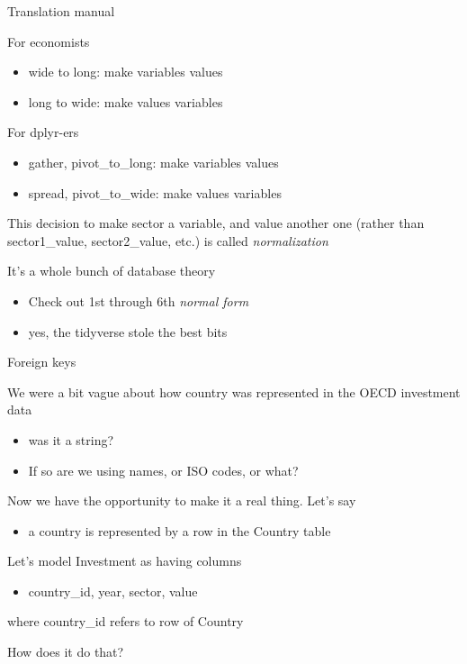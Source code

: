 \documentclass{hertieteaching}
\begin{document}
\begin{frame}{Translation manual}

For economists
\begin{itemize}
  \item wide to long: make variables values
  \item long to wide: make values variables
\end{itemize}

For \textsf{dplyr}-ers
\begin{itemize}
  \item \textsf{gather}, \textsf{pivot\_to\_long}: make variables values
  \item \textsf{spread}, \textsf{pivot\_to\_wide}: make values variables
\end{itemize}

This decision to make sector a 
variable, and value another one (rather than \textsf{sector1\_value}, \textsf{sector2\_value}, etc.) is called 
\textit{normalization}

It's a whole bunch of database theory
\begin{itemize}
  \item Check out 1st through 6th \textit{normal form}
  \item yes, the \textsf{tidyverse} stole the best bits 
\end{itemize}
	
\end{frame}

\begin{frame}{Foreign keys}

We were a bit vague about how country was represented in the OECD investment data
\begin{itemize}
  \item was it a string? 
  \item If so are we using names, or ISO codes, or what?
\end{itemize}
Now we have the opportunity to make it a real thing. Let's say
\begin{itemize}
  \item a country is represented by a row in the \textsf{Country} table
\end{itemize}

Let's model Investment as having columns

\begin{itemize}
  \item \textsf{country\_id}, \textsf{year}, \textsf{sector}, \textsf{value}
\end{itemize}

where \textsf{country\_id} refers to  row of \textsf{Country}

How does it do that?
\end{frame}
\end{document}
